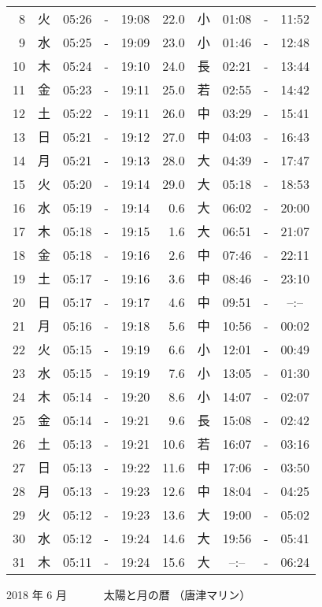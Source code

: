 \documentclass[a4j,10pt]{jsarticle}
\begin{document}
\begin{center}
\begin{table}[ht]
\begin{center}
\begin{tabular}{|rc|ccc|rc|ccc|}
  8 & 火 & 05:26 &-& 19:08 & 22.0 & 小 & 01:08 &-& 11:52 \\
  9 & 水 & 05:25 &-& 19:09 & 23.0 & 小 & 01:46 &-& 12:48 \\
 10 & 木 & 05:24 &-& 19:10 & 24.0 & 長 & 02:21 &-& 13:44 \\
 11 & 金 & 05:23 &-& 19:11 & 25.0 & 若 & 02:55 &-& 14:42 \\
 12 & 土 & 05:22 &-& 19:11 & 26.0 & 中 & 03:29 &-& 15:41 \\
 13 & 日 & 05:21 &-& 19:12 & 27.0 & 中 & 04:03 &-& 16:43 \\
 14 & 月 & 05:21 &-& 19:13 & 28.0 & 大 & 04:39 &-& 17:47 \\
 15 & 火 & 05:20 &-& 19:14 & 29.0 & 大 & 05:18 &-& 18:53 \\
 16 & 水 & 05:19 &-& 19:14 &  0.6 & 大 & 06:02 &-& 20:00 \\
 17 & 木 & 05:18 &-& 19:15 &  1.6 & 大 & 06:51 &-& 21:07 \\
 18 & 金 & 05:18 &-& 19:16 &  2.6 & 中 & 07:46 &-& 22:11 \\
 19 & 土 & 05:17 &-& 19:16 &  3.6 & 中 & 08:46 &-& 23:10 \\
 20 & 日 & 05:17 &-& 19:17 &  4.6 & 中 & 09:51 &-& --:-- \\
 21 & 月 & 05:16 &-& 19:18 &  5.6 & 中 & 10:56 &-& 00:02 \\
 22 & 火 & 05:15 &-& 19:19 &  6.6 & 小 & 12:01 &-& 00:49 \\
 23 & 水 & 05:15 &-& 19:19 &  7.6 & 小 & 13:05 &-& 01:30 \\
 24 & 木 & 05:14 &-& 19:20 &  8.6 & 小 & 14:07 &-& 02:07 \\
 25 & 金 & 05:14 &-& 19:21 &  9.6 & 長 & 15:08 &-& 02:42 \\
 26 & 土 & 05:13 &-& 19:21 & 10.6 & 若 & 16:07 &-& 03:16 \\
 27 & 日 & 05:13 &-& 19:22 & 11.6 & 中 & 17:06 &-& 03:50 \\
 28 & 月 & 05:13 &-& 19:23 & 12.6 & 中 & 18:04 &-& 04:25 \\
 29 & 火 & 05:12 &-& 19:23 & 13.6 & 大 & 19:00 &-& 05:02 \\
 30 & 水 & 05:12 &-& 19:24 & 14.6 & 大 & 19:56 &-& 05:41 \\
 31 & 木 & 05:11 &-& 19:24 & 15.6 & 大 & --:-- &-& 06:24 \\
\hline
\end{tabular}
\end{center}
\end{table}
\newpage
{\large 2018 年  6 月}
{\Large 　　　太陽と月の暦   （唐津マリン） }

\end{center}
\end{document}
